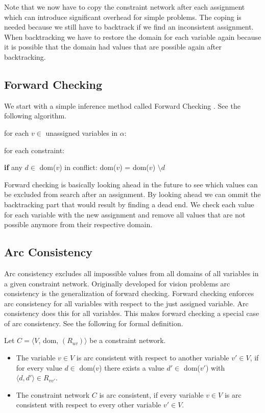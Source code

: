 Note that we now have to copy the constraint network after each assignment which can introduce significant overhead for simple problems. The coping is needed because we still have to backtrack if we find an inconsistent assignment. When backtracking we have to restore the domain for each variable again because it is possible that the domain had values that are possible again after backtracking.

\subsection{Forward Checking}

We start with a simple inference method called Forward Checking \cite{forward_checking:1980}. See the following algorithm.

\begin{tcolorbox}[title={function ForwardChecking($C, \alpha$)}]
	for each $v \in $ unassigned variables in $\alpha$:

	for each constraint:

	\textbf{if} any $d \in$ dom($v$) in conflict:
	dom($v$) = dom($v$) $\setminus d$
\end{tcolorbox}

Forward checking is basically looking ahead in the future to see which values can be excluded from search after an assignment. By looking ahead we can ommit the backtracking part that would result by finding a dead end. We check each value for each variable with the new assignment and remove all values that are not possible anymore from their respective domain.

\subsection{Arc Consistency}

Arc consistency excludes all impossible values from all domains of all variables in a given constraint network. Originally developed for vision problems \cite{original_arc:1988} arc consistency is the generalization of forward checking. Forward checking enforces arc consistency for all variables with respect to the just assigned variable. Arc consistency does this for all variables. This makes forward checking a special case of arc consistency. See the following for formal definition.

\begin{tcolorbox}[title=Definition: Arc Consistent]
	Let $C = \langle V$, dom, $(R_{uv})\rangle$ be a constraint network.
	\begin{itemize}
		\item The variable $v \in V$ is arc consistent with respect to another variable $v'\in V$, if for every value $d \in$ dom($v$) there exists a value $d' \in$ dom($v'$) with $\langle d, d' \rangle \in R_{vv'}$.
		\item The constraint network $C$ is arc consistent, if every variable $v \in V$ is arc consistent with respect to every other variable $v' \in V$.
	\end{itemize}
\end{tcolorbox}

